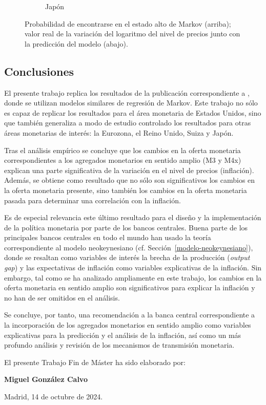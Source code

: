 \documentclass[titlepage, 12pt]{article}
\begin{document}
\begin{figure}
\begin{subfigure}[b]{0.49\textwidth}
        \caption{Japón}
    \end{subfigure}
    \caption{Probabilidad de encontrarse en el estado alto de Markov (arriba); valor real de la variación del logaritmo del nivel de precios junto con la predicción del modelo (abajo).}
    \label{fig:markov-cpi}
\end{figure}

\newpage
\subsection{Conclusiones}
El presente trabajo replica los resultados de la publicación correspondiente a \cite{castaneda2023}, donde se utilizan modelos similares de regresión de Markov. Este trabajo no sólo es capaz de replicar los resultados para el área monetaria de Estados Unidos, sino que también generaliza a modo de estudio controlado los resultados para otras áreas monetarias de interés: la Eurozona, el Reino Unido, Suiza y Japón.

Tras el análisis empírico se concluye que los cambios en la oferta monetaria correspondientes a los agregados monetarios en sentido amplio (M3 y M4x) explican una parte significativa de la variación en el nivel de precios (inflación). Además, se obtiene como resultado que no sólo son significativos los cambios en la oferta monetaria presente, sino también los cambios en la oferta monetaria pasada para determinar una correlación con la inflación.

Es de especial relevancia este último resultado para el diseño y la implementación de la política monetaria por parte de los bancos centrales. Buena parte de los principales bancos centrales en todo el mundo han usado la teoría correspondiente al modelo neokeynesiano (cf. Sección~\ref{modelo-neokeynesiano}), donde se resaltan como variables de interés la brecha de la producción (\textit{output gap}) y las expectativas de inflación como variables explicativas de la inflación. Sin embargo, tal como se ha analizado ampliamente en este trabajo, los cambios en la oferta monetaria en sentido amplio son significativos para explicar la inflación y no han de ser omitidos en el análisis.

Se concluye, por tanto, una recomendación a la banca central correspondiente a la incorporación de los agregados monetarios en sentido amplio como variables explicativas para la predicción y el análisis de la inflación, así como un más profundo análisis y revisión de los mecanismos de transmisión monetaria.

\nocite{*}
\newpage
\printbibliography

\newpage
\begin{appendices}
    
\end{appendices}

\newpage

El presente Trabajo Fin de Máster ha sido elaborado por:

\vspace{3cm}

\textbf{Miguel González Calvo}

Madrid, 14 de octubre de 2024.
\end{document}

